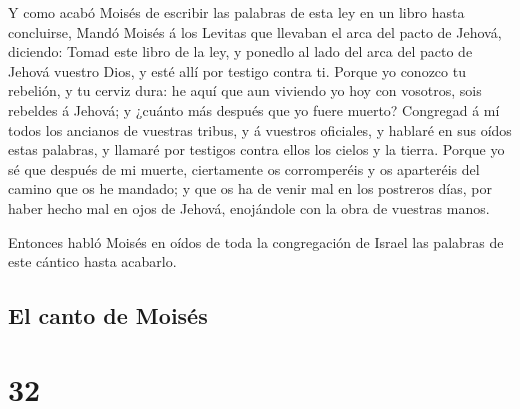  Y como acabó Moisés de escribir las palabras de esta ley
en un libro hasta concluirse,  Mandó Moisés á los Levitas
que llevaban el arca del pacto de Jehová, diciendo:  Tomad
este libro de la ley, y ponedlo al lado del arca del pacto de Jehová
vuestro Dios, y esté allí por testigo contra ti.  Porque yo
conozco tu rebelión, y tu cerviz dura: he aquí que aun viviendo yo hoy
con vosotros, sois rebeldes á Jehová; y ¿cuánto más después que yo fuere
muerto?  Congregad á mí todos los ancianos de vuestras
tribus, y á vuestros oficiales, y hablaré en sus oídos estas palabras, y
llamaré por testigos contra ellos los cielos y la tierra. 
Porque yo sé que después de mi muerte, ciertamente os corromperéis y os
aparteréis del camino que os he mandado; y que os ha de venir mal en los
postreros días, por haber hecho mal en ojos de Jehová, enojándole con la
obra de vuestras manos.

 Entonces habló Moisés en oídos de toda la congregación de
Israel las palabras de este cántico hasta acabarlo.

\hypertarget{el-canto-de-moisuxe9s}{%
\subsection{El canto de Moisés}\label{el-canto-de-moisuxe9s}}

\hypertarget{section-31}{%
\section{32}\label{section-31}}


